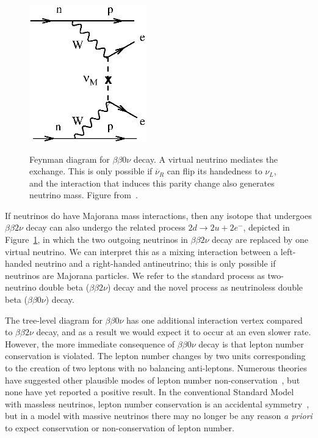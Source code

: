 \begin{figure}
\begin{center}
\includegraphics[keepaspectratio=true,width=2in]{Avignone_fig02b.eps}
\end{center}
\renewcommand{\baselinestretch}{1}
\small\normalsize
\begin{quote}
\caption{Feynman diagram for $\beta\beta 0 \nu$ decay.  A virtual neutrino mediates the exchange.  This is only possible if $\overline{\nu}_R$ can flip its handedness to $\nu_L$, and the interaction that induces this parity change also generates neutrino mass.  Figure from~\cite{RMPbb0n}.}
\label{fig:FeynmanBetaBeta0Nu}
\end{quote}
\end{figure}
\renewcommand{\baselinestretch}{2}
\small\normalsize

If neutrinos do have Majorana mass interactions, then any isotope that undergoes $\beta\beta 2\nu$ decay can also undergo the related process $2d \rightarrow 2u + 2e^-$, depicted in Figure~\ref{fig:FeynmanBetaBeta0Nu}, in which the two outgoing neutrinos in $\beta\beta 2\nu$ decay are replaced by one virtual neutrino.  We can interpret this as a mixing interaction between a left-handed neutrino and a right-handed antineutrino; this is only possible if neutrinos are Majorana particles.  We refer to the standard process as two-neutrino double beta ($\beta\beta 2\nu$) decay and the novel process as neutrinoless double beta ($\beta\beta 0\nu$) decay.

The tree-level diagram for $\beta\beta 0\nu$ has one additional interaction vertex compared to $\beta\beta 2\nu$ decay, and as a result we would expect it to occur at an even slower rate.  However, the more immediate consequence of $\beta\beta 0\nu$ decay is that lepton number conservation is violated.  The lepton number changes by two units corresponding to the creation of two leptons with no balancing anti-leptons.  Numerous theories have suggested other plausible modes of lepton number non-conservation~\cite{ProtonDecay,MuonToPositron}, but none have yet reported a positive result.  In the conventional Standard Model with massless neutrinos, lepton number conservation is an accidental symmetry~\cite{LeptonConservation}, but in a model with massive neutrinos there may no longer be any reason \textit{a priori} to expect conservation or non-conservation of lepton number.

